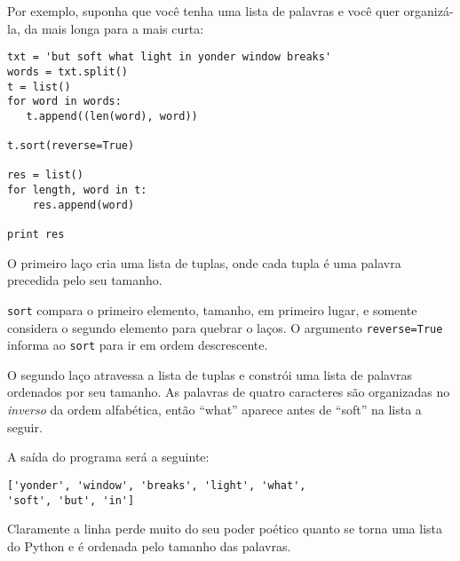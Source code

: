 \label{DSU}

Por exemplo, suponha que você tenha uma lista de palavras e você
quer organizá-la, da mais longa para a mais curta:

\beforeverb
\begin{verbatim}
txt = 'but soft what light in yonder window breaks'
words = txt.split()
t = list()
for word in words:
   t.append((len(word), word))

t.sort(reverse=True)

res = list()
for length, word in t:
    res.append(word)

print res
\end{verbatim}
\afterverb
%
O primeiro laço cria uma lista de tuplas, onde cada tupla é
uma palavra precedida pelo seu tamanho.

{\tt sort} compara o primeiro elemento, tamanho, em primeiro lugar, e
somente considera o segundo elemento para quebrar o laços. O argumento
{\tt reverse=True} informa ao {\tt sort} para ir em ordem descrescente.


O segundo laço atravessa a lista de tuplas e constrói uma lista de palavras
ordenados por seu tamanho. As palavras de quatro caracteres são organizadas
no {\em inverso} da ordem alfabética, então ``what'' aparece antes de ``soft''
na lista a seguir.

A saída do programa será a seguinte:
%
\beforeverb
\begin{verbatim}
['yonder', 'window', 'breaks', 'light', 'what', 
'soft', 'but', 'in']
\end{verbatim}
\afterverb
%
Claramente a linha perde muito do seu poder poético quanto se torna uma lista
do Python e é ordenada pelo tamanho das palavras.


